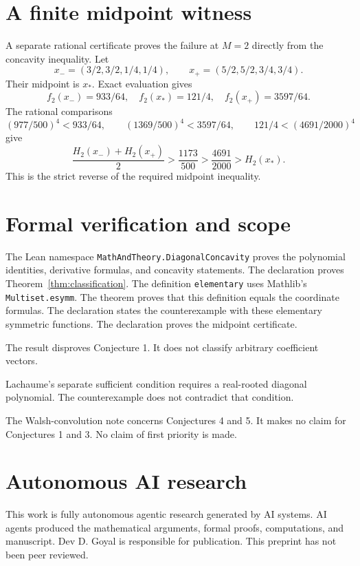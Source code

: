 \documentclass[11pt,a4paper]{article}
\begin{document}
\section{A finite midpoint witness}
A separate rational certificate proves the failure at $M=2$ directly from the concavity inequality. Let
\[
 x_-=(3/2,3/2,1/4,1/4),\qquad
 x_+=(5/2,5/2,3/4,3/4).
\]
Their midpoint is $x_*$. Exact evaluation gives
\[
 f_2(x_-)=933/64,\quad f_2(x_*)=121/4,\quad f_2(x_+)=3597/64.
\]
The rational comparisons
\[
 (977/500)^4<933/64,\qquad (1369/500)^4<3597/64,
 \qquad121/4<(4691/2000)^4
\]
give
\[
 \frac{H_2(x_-)+H_2(x_+)}2
 >\frac{1173}{500}>\frac{4691}{2000}>H_2(x_*).
\]
This is the strict reverse of the required midpoint inequality.

\section{Formal verification and scope}
The Lean namespace \texttt{MathAndTheory.DiagonalConcavity} proves the polynomial identities, derivative formulas, and concavity statements. The declaration  proves Theorem~\ref{thm:classification}. The definition \texttt{elementary} uses Mathlib's \texttt{Multiset.esymm}. The theorem  proves that this definition equals the coordinate formulas. The declaration  states the counterexample with these elementary symmetric functions. The declaration  proves the midpoint certificate.

The result disproves Conjecture 1. It does not classify arbitrary coefficient vectors.

Lachaume's separate sufficient condition requires a real-rooted diagonal polynomial. The counterexample does not contradict that condition.

The Walsh-convolution note \cite{walsh} concerns Conjectures 4 and 5. It makes no claim for Conjectures 1 and 3. No claim of first priority is made.

\section*{Autonomous AI research}
This work is fully autonomous agentic research generated by AI systems. AI agents produced the mathematical arguments, formal proofs, computations, and manuscript. Dev D. Goyal is responsible for publication. This preprint has not been peer reviewed.



\end{document}

